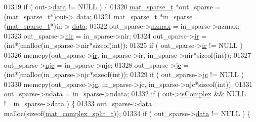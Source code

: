 \begin{DoxyCode}
{{{{{{{{{{{{{{{{{{{{{{{{{{{{{{01319         \textcolor{keywordflow}{if} ( out->\hyperlink{group___m_a_t_a5672978efa230bbdecdf38ede781f7fa}{data} != NULL ) \{
01320             \hyperlink{group___m_a_t_structmat__sparse__t}{mat\_sparse\_t} *out\_sparse = (\hyperlink{group___m_a_t_structmat__sparse__t}{mat\_sparse\_t}*)out->
      \hyperlink{group___m_a_t_a5672978efa230bbdecdf38ede781f7fa}{data};
01321             \hyperlink{group___m_a_t_structmat__sparse__t}{mat\_sparse\_t} *in\_sparse  = (\hyperlink{group___m_a_t_structmat__sparse__t}{mat\_sparse\_t}*)in->
      \hyperlink{group___m_a_t_a5672978efa230bbdecdf38ede781f7fa}{data};
01322             out\_sparse->\hyperlink{group___m_a_t_ad79471861cb948e32671be6d4089173a}{nzmax} = in\_sparse->nzmax;
01323             out\_sparse->\hyperlink{group___m_a_t_aa64636ad57cf87f7a28ff5018437a850}{nir} = in\_sparse->nir;
01324             out\_sparse->\hyperlink{group___m_a_t_a8d4c863d704edddec5cbfa15b2d719c8}{ir} = (\textcolor{keywordtype}{int}*)malloc(in\_sparse->nir*\textcolor{keyword}{sizeof}(\textcolor{keywordtype}{int}));
01325             \textcolor{keywordflow}{if} ( out\_sparse->\hyperlink{group___m_a_t_a8d4c863d704edddec5cbfa15b2d719c8}{ir} != NULL )
01326                 memcpy(out\_sparse->\hyperlink{group___m_a_t_a8d4c863d704edddec5cbfa15b2d719c8}{ir}, in\_sparse->ir, in\_sparse->nir*\textcolor{keyword}{sizeof}(\textcolor{keywordtype}{int}));
01327             out\_sparse->\hyperlink{group___m_a_t_a482d8e4b40aa975f0c1daf146ebe08a4}{njc} = in\_sparse->njc;
01328             out\_sparse->\hyperlink{group___m_a_t_ad1e74cdc4f7eff1e47a670297c01da4b}{jc} = (\textcolor{keywordtype}{int}*)malloc(in\_sparse->njc*\textcolor{keyword}{sizeof}(\textcolor{keywordtype}{int}));
01329             \textcolor{keywordflow}{if} ( out\_sparse->\hyperlink{group___m_a_t_ad1e74cdc4f7eff1e47a670297c01da4b}{jc} != NULL )
01330                 memcpy(out\_sparse->\hyperlink{group___m_a_t_ad1e74cdc4f7eff1e47a670297c01da4b}{jc}, in\_sparse->jc, in\_sparse->njc*\textcolor{keyword}{sizeof}(\textcolor{keywordtype}{int}));
01331             out\_sparse->\hyperlink{group___m_a_t_a1beb8a8c58a808207cbea650563a9b63}{ndata} = in\_sparse->ndata;
01332             \textcolor{keywordflow}{if} ( out->\hyperlink{group___m_a_t_aeb03b3a69f108dc05470b00443a43739}{isComplex} && NULL != in\_sparse->data ) \{
01333                 out\_sparse->\hyperlink{group___m_a_t_ae2c648cb9eac4ce47f26cddb44246152}{data} = malloc(\textcolor{keyword}{sizeof}(\hyperlink{group___m_a_t_structmat__complex__split__t}{mat\_complex\_split\_t}));
01334                 \textcolor{keywordflow}{if} ( out\_sparse->\hyperlink{group___m_a_t_ae2c648cb9eac4ce47f26cddb44246152}{data} != NULL ) \{
}}}}}}}}}}}}}}}}}}}}}}}}}}}}}}
\end{DoxyCode}
